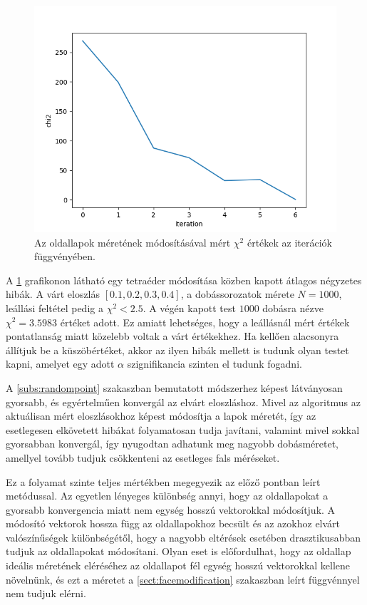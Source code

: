 \begin{figure}[h!]
	\centering
	\includegraphics[scale=0.7]{images/facemodify_chi2.png}
	\caption{Az oldallapok méretének módosításával mért $\chi^2$ értékek az iterációk függvényében.}
	\label{fig:facemodify_chi2}
\end{figure}

A \ref{fig:facemodify_chi2} grafikonon látható egy tetraéder módosítása közben kapott átlagos négyzetes hibák.
A várt eloszlás $[0.1, 0.2, 0.3, 0.4]$, a dobássorozatok mérete $N=1000$, leállási feltétel pedig a $\chi^2 < 2.5$.
A végén kapott test $1000$ dobásra nézve $\chi^2 = 3.5983$ értéket adott.
Ez amiatt lehetséges, hogy a leállásnál mért értékek pontatlanság miatt közelebb voltak a várt értékekhez.
Ha kellően alacsonyra állítjuk be a küszöbértéket, akkor az ilyen hibák mellett is tudunk olyan testet kapni, amelyet egy adott $\alpha$ szignifikancia szinten el tudunk fogadni.

A \ref{subs:randompoint} szakaszban bemutatott módszerhez képest látványosan gyorsabb, és egyértelműen konvergál az elvárt eloszláshoz.
Mivel az algoritmus az aktuálisan mért eloszlásokhoz képest módosítja a lapok méretét, így az esetlegesen elkövetett hibákat folyamatosan tudja javítani, valamint mivel sokkal gyorsabban konvergál, így nyugodtan adhatunk meg nagyobb dobásméretet, amellyel tovább tudjuk csökkenteni az esetleges fals méréseket.

\label{sect:ratiomodification}

Ez a folyamat szinte teljes mértékben megegyezik az előző pontban leírt metódussal.
Az egyetlen lényeges különbség annyi, hogy az oldallapokat a gyorsabb konvergencia miatt nem egység hosszú vektorokkal módosítjuk.
A módosító vektorok hossza függ az oldallapokhoz becsült és az azokhoz elvárt valószínűségek különbségétől, hogy a nagyobb eltérések esetében drasztikusabban tudjuk az oldallapokat módosítani.
Olyan eset is előfordulhat, hogy az oldallap ideális méretének eléréséhez az oldallapot fél egység hosszú vektorokkal kellene növelnünk, és ezt a méretet a \ref{sect:facemodification} szakaszban leírt függvénnyel nem tudjuk elérni.

